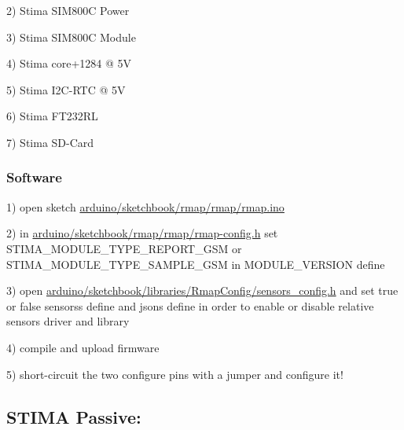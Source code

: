 2) Stima S\+I\+M800C Power

3) Stima S\+I\+M800C Module

4) Stima core+1284 @ 5V

5) Stima I2\+C-\/\+R\+TC @ 5V

6) Stima F\+T232\+RL

7) Stima S\+D-\/\+Card\hypertarget{index_stima_gsm_software}{}\subsubsection{Software}\label{index_stima_gsm_software}
1) open sketch \hyperlink{rmap_8ino}{arduino/sketchbook/rmap/rmap/rmap.\+ino}

2) in \hyperlink{rmap-config_8h}{arduino/sketchbook/rmap/rmap/rmap-\/config.\+h} set S\+T\+I\+M\+A\+\_\+\+M\+O\+D\+U\+L\+E\+\_\+\+T\+Y\+P\+E\+\_\+\+R\+E\+P\+O\+R\+T\+\_\+\+G\+SM or S\+T\+I\+M\+A\+\_\+\+M\+O\+D\+U\+L\+E\+\_\+\+T\+Y\+P\+E\+\_\+\+S\+A\+M\+P\+L\+E\+\_\+\+G\+SM in M\+O\+D\+U\+L\+E\+\_\+\+V\+E\+R\+S\+I\+ON define

3) open \hyperlink{sensors__config_8h}{arduino/sketchbook/libraries/\+Rmap\+Config/sensors\+\_\+config.\+h} and set true or false sensors\textquotesingle{}s define and json\textquotesingle{}s define in order to enable or disable relative sensor\textquotesingle{}s driver and library

4) compile and upload firmware

5) short-\/circuit the two configure pins with a jumper and configure it!\hypertarget{index_stima_passive}{}\subsection{S\+T\+I\+M\+A Passive\+:}\label{index_stima_passive}
 
